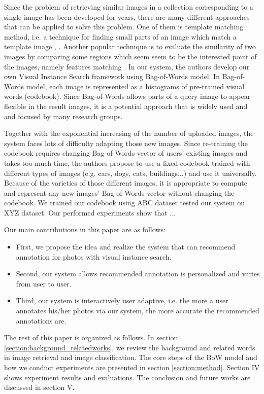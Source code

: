 Since the problem of retrieving similar images in a collection corresponding to a single image has been developed for years, there are many different approaches that can be applied to solve this problem. One of them is template matching method, i.e. a technique for finding small parts of an image which match a template image \cite{brunelli_template_matching}, \cite{Rosenfeld4309663, Gharavi913587}. Another popular technique is to evaluate the similarity of two images by comparing some regions which seem seem to be the interested point of the images, namely features matching \cite{Belongie710790, Rubner, Viola990517}. In our system, the authors develop our own Visual Instance Search framework using Bag-of-Words model. In Bag-of-Words model, each image is represented as a histograms of pre-trained visual words (codebook). Since Bag-of-Words allows parts of a query image to appear flexible in the result images, it is a potential approach that is widely used and and focused by many research groups. 

Together with the exponential increasing of the number of uploaded images, the system faces lots of difficulty adapting those new images. Since re-training the codebook requires changing Bag-of-Words vector of users' existing images and takes too much time, the authors propose to use a fixed codebook trained with different types of images (e.g. cars, dogs, cats, buildings...) and use it universally. Because of the varieties of those different images, it is appropriate to compute and represent any new images' Bag-of-Words vector without changing the codebook. We trained our codebook using ABC dataset tested our system on XYZ dataset. Our performed experiments show that ...

Our main contributions in this paper are as follows:
\begin{itemize}
	\item First, we propose the idea and realize the system that can recommend annotation for photos with visual instance search.
	\item Second, our system allows recommended annotation is personalized and varies from user to user.
	\item Third, our system is interactively user adaptive, i.e. the more a user annotates his/her photos via our system, the more accurate the recommended annotations are.
\end{itemize}

The rest of this paper is organized as follows. In section \ref{section:background_relatedworks}, we review the background and related words in image retrieval and image classification. The core steps of the BoW model and how we conduct experiments are presented in section \ref{section:method}. Section IV shows experiment results and evaluations. The conclusion and future works are discussed in section V.
